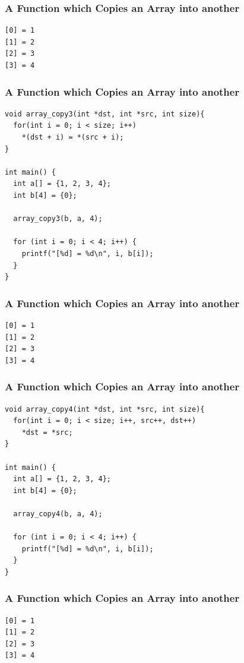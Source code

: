 \documentclass{../c-lecture}
\begin{document}
\begin{frame}[fragile]
  \frametitle{A Function which Copies an Array into another}
  \begin{verbatim}
[0] = 1
[1] = 2
[2] = 3
[3] = 4
  \end{verbatim}
\end{frame}

\begin{frame}[fragile]
  \frametitle{A Function which Copies an Array into another}
  \scriptsize
  \begin{verbatim}
void array_copy3(int *dst, int *src, int size){
  for(int i = 0; i < size; i++)
    *(dst + i) = *(src + i);
}

int main() {
  int a[] = {1, 2, 3, 4};
  int b[4] = {0};

  array_copy3(b, a, 4);

  for (int i = 0; i < 4; i++) {
    printf("[%d] = %d\n", i, b[i]);
  }
}
  \end{verbatim}
\end{frame}

\begin{frame}[fragile]
  \frametitle{A Function which Copies an Array into another}
  \begin{verbatim}
[0] = 1
[1] = 2
[2] = 3
[3] = 4
  \end{verbatim}
\end{frame}

\begin{frame}[fragile]
  \frametitle{A Function which Copies an Array into another}
  \scriptsize
  \begin{verbatim}
void array_copy4(int *dst, int *src, int size){
  for(int i = 0; i < size; i++, src++, dst++)
    *dst = *src;
}

int main() {
  int a[] = {1, 2, 3, 4};
  int b[4] = {0};

  array_copy4(b, a, 4);

  for (int i = 0; i < 4; i++) {
    printf("[%d] = %d\n", i, b[i]);
  }
}
  \end{verbatim}
\end{frame}

\begin{frame}[fragile]
  \frametitle{A Function which Copies an Array into another}
  \begin{verbatim}
[0] = 1
[1] = 2
[2] = 3
[3] = 4
  \end{verbatim}
\end{frame}
\end{document}
